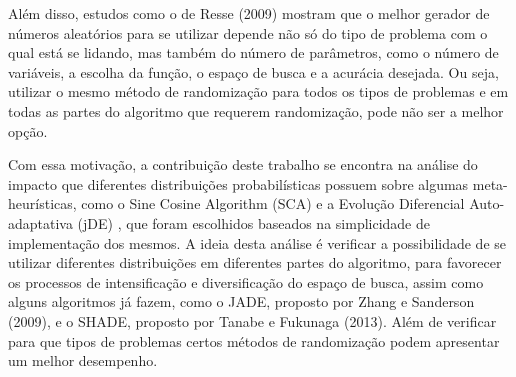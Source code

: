 
Além disso, estudos como o de Resse (2009) mostram que o melhor gerador de números aleatórios para se utilizar depende não só do tipo de problema com o qual está se lidando, mas também do número de parâmetros, como o número de variáveis, a escolha da função, o espaço de busca e a acurácia desejada. Ou seja, utilizar o mesmo método de randomização para todos os tipos de problemas e em todas as partes do algoritmo que requerem randomização, pode não ser a melhor opção.

Com essa motivação, a contribuição deste trabalho se encontra na análise do impacto que diferentes distribuições probabilísticas possuem sobre algumas meta-heurísticas, como o Sine Cosine Algorithm (SCA) \cite{mirjalili} e a Evolução Diferencial Auto-adaptativa (jDE) \cite{brest}, que foram escolhidos baseados na simplicidade de implementação dos mesmos. A ideia desta análise é verificar a possibilidade de se utilizar diferentes distribuições em diferentes partes do algoritmo, para favorecer os processos de intensificação e diversificação do espaço de busca, assim como alguns algoritmos já fazem, como o JADE, proposto por Zhang e Sanderson (2009), e o SHADE, proposto por Tanabe e Fukunaga (2013). Além de verificar para que tipos de problemas certos métodos de randomização podem apresentar um melhor desempenho.






